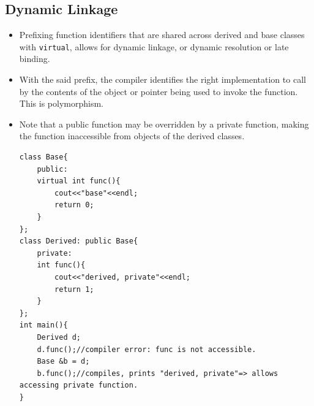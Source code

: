 \documentclass{report}
\begin{document}
\subsection{Dynamic Linkage}
\begin{itemize}
\item Prefixing function identifiers that are shared across derived and base classes with \texttt{virtual}, allows for dynamic linkage, or dynamic resolution or late binding.
\item With the said prefix, the compiler identifies the right implementation to call by the contents of the object or pointer being used to invoke the function. This is polymorphism.
\item Note that a public function may be overridden by a private function, making the function inaccessible from objects of the derived classes.
\begin{lstlisting}
class Base{
    public:
    virtual int func(){
        cout<<"base"<<endl;
        return 0;
    }
};
class Derived: public Base{
    private:
    int func(){
        cout<<"derived, private"<<endl;
        return 1;
    }
};
int main(){
    Derived d;
    d.func();//compiler error: func is not accessible.
    Base &b = d;
    b.func();//compiles, prints "derived, private"=> allows accessing private function.
}
\end{lstlisting}
\end{itemize}
\end{document}
